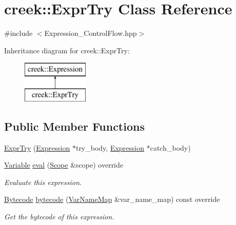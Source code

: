 \hypertarget{classcreek_1_1_expr_try}{}\section{creek\+:\+:Expr\+Try Class Reference}
\label{classcreek_1_1_expr_try}


{\ttfamily \#include $<$Expression\+\_\+\+Control\+Flow.\+hpp$>$}

Inheritance diagram for creek\+:\+:Expr\+Try\+:\begin{figure}[H]
\begin{center}
\leavevmode
\includegraphics[height=2.000000cm]{classcreek_1_1_expr_try}
\end{center}
\end{figure}
\subsection*{Public Member Functions}
\begin{DoxyCompactItemize}
\item 
\hyperlink{classcreek_1_1_expr_try_a146f0345138888f21b4762aab3e67da5}{Expr\+Try} (\hyperlink{classcreek_1_1_expression}{Expression} $\ast$try\+\_\+body, \hyperlink{classcreek_1_1_expression}{Expression} $\ast$catch\+\_\+body)
\item 
\hyperlink{classcreek_1_1_variable}{Variable} \hyperlink{classcreek_1_1_expr_try_a86c2677212b9cb689209cedf9196767c}{eval} (\hyperlink{classcreek_1_1_scope}{Scope} \&scope) override
\begin{DoxyCompactList}\small\item\em Evaluate this expression. \end{DoxyCompactList}\item 
\hyperlink{classcreek_1_1_bytecode}{Bytecode} \hyperlink{classcreek_1_1_expr_try_a9e74484ffba69cd31e653cf896cbb12e}{bytecode} (\hyperlink{classcreek_1_1_var_name_map}{Var\+Name\+Map} \&var\+\_\+name\+\_\+map) const  override\hypertarget{classcreek_1_1_expr_try_a9e74484ffba69cd31e653cf896cbb12e}{}\label{classcreek_1_1_expr_try_a9e74484ffba69cd31e653cf896cbb12e}

\begin{DoxyCompactList}\small\item\em Get the bytecode of this expression. \end{DoxyCompactList}\end{DoxyCompactItemize}



